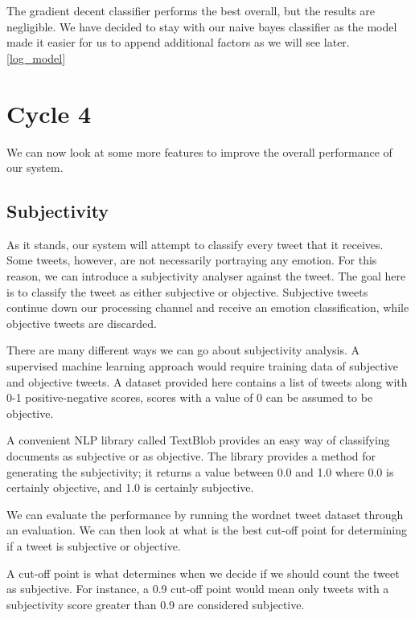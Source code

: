 The gradient decent classifier performs the best overall, but the results are negligible. We have decided to stay with our naive bayes classifier as the model made it easier for us to append additional factors as we will see later. \ref{log_model}

\section{Cycle 4}

We can now look at some more features to improve the overall performance of our system.

\subsection{Subjectivity}

As it stands, our system will attempt to classify every tweet that it receives. Some tweets, however, are not necessarily portraying any emotion. For this reason, we can introduce a subjectivity analyser against the tweet. The goal here is to classify the tweet as either subjective or objective. Subjective tweets continue down our processing channel and receive an emotion classification, while objective tweets are discarded.

There are many different ways we can go about subjectivity analysis. A supervised machine learning approach would require training data of subjective and objective tweets. A dataset provided here \cite{baccianella2010sentiwordnet} contains a list of tweets along with 0-1 positive-negative scores, scores with a value of 0 can be assumed to be objective.

A convenient NLP library called TextBlob \cite{textblob} provides an easy way of classifying documents as subjective or as objective. The library provides a method for generating the subjectivity; it returns a value between 0.0 and 1.0 where 0.0 is certainly objective, and 1.0 is certainly subjective.

We can evaluate the performance by running the wordnet tweet dataset through an evaluation. We can then look at what is the best cut-off point for determining if a tweet is subjective or objective.

A cut-off point is what determines when we decide if we should count the tweet as subjective. For instance, a 0.9 cut-off point would mean only tweets with a subjectivity score greater than 0.9 are considered subjective.

